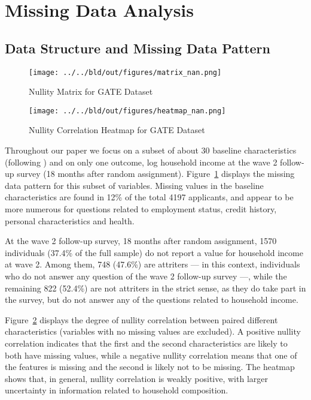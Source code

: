 
\section{Missing Data Analysis}

\subsection{Data Structure and Missing Data Pattern}

\begin{figure}[t]
    \caption{Nullity Matrix for GATE Dataset}
    \texttt{[image: ../../bld/out/figures/matrix\_nan.png]}
    \label{fig:matrix_nan}
\end{figure}

\begin{figure}[t]
    \caption{Nullity Correlation Heatmap for GATE Dataset}
    \texttt{[image: ../../bld/out/figures/heatmap\_nan.png]}
    \label{fig:heatmap_nan}
\end{figure}

Throughout our paper we focus on a subset of about 30 baseline characteristics (following \cite{fairlie2015behind}) and on only one outcome, log household income at the wave 2 follow-up survey (18 months after random assignment). Figure~\ref{fig:matrix_nan} displays the missing data pattern for this subset of variables. Missing values in the baseline characteristics are found in 12\% of the total 4197 applicants, and appear to be more numerous for questions related to employment status, credit history, personal characteristics and health.

At the wave 2 follow-up survey, 18 months after random assignment, 1570 individuals (37.4\% of the full sample) do not report a value for household income at wave 2. Among them, 748 (47.6\%) are attriters --- in this context, individuals who do not answer any question of the wave 2 follow-up survey ---, while the remaining 822 (52.4\%) are not attriters in the strict sense, as they do take part in the survey, but do not answer any of the questions related to household income.

Figure~\ref{fig:heatmap_nan} displays the degree of nullity correlation between paired different characteristics (variables with no missing values are excluded). A positive nullity correlation indicates that the first and the second characteristics are likely to both have missing values, while a negative nullity correlation means that one of the features is missing and the second is likely not to be missing. The heatmap shows that, in general, nullity correlation is weakly positive, with larger uncertainty in information related to household composition.

